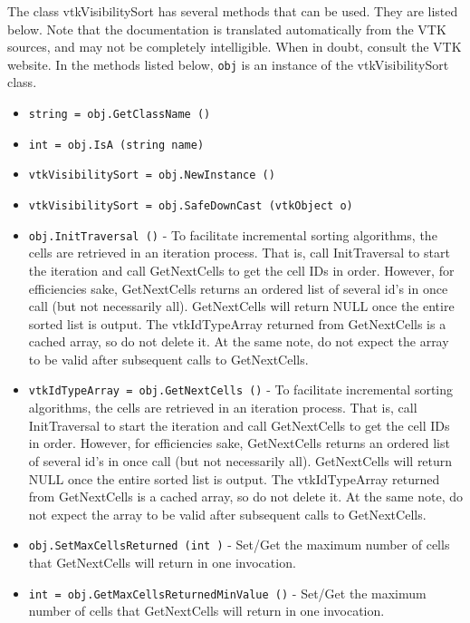 The class vtkVisibilitySort has several methods that can be used.
  They are listed below.
Note that the documentation is translated automatically from the VTK sources,
and may not be completely intelligible.  When in doubt, consult the VTK website.
In the methods listed below, \verb|obj| is an instance of the vtkVisibilitySort class.
\begin{itemize}
\item  \verb|string = obj.GetClassName ()|

\item  \verb|int = obj.IsA (string name)|

\item  \verb|vtkVisibilitySort = obj.NewInstance ()|

\item  \verb|vtkVisibilitySort = obj.SafeDownCast (vtkObject o)|

\item  \verb|obj.InitTraversal ()| -  To facilitate incremental sorting algorithms, the cells are retrieved
 in an iteration process.  That is, call InitTraversal to start the
 iteration and call GetNextCells to get the cell IDs in order.
 However, for efficiencies sake, GetNextCells returns an ordered list
 of several id's in once call (but not necessarily all).  GetNextCells
 will return NULL once the entire sorted list is output.  The
 vtkIdTypeArray returned from GetNextCells is a cached array, so do not
 delete it.  At the same note, do not expect the array to be valid
 after subsequent calls to GetNextCells.

\item  \verb|vtkIdTypeArray = obj.GetNextCells ()| -  To facilitate incremental sorting algorithms, the cells are retrieved
 in an iteration process.  That is, call InitTraversal to start the
 iteration and call GetNextCells to get the cell IDs in order.
 However, for efficiencies sake, GetNextCells returns an ordered list
 of several id's in once call (but not necessarily all).  GetNextCells
 will return NULL once the entire sorted list is output.  The
 vtkIdTypeArray returned from GetNextCells is a cached array, so do not
 delete it.  At the same note, do not expect the array to be valid
 after subsequent calls to GetNextCells.

\item  \verb|obj.SetMaxCellsReturned (int )| -  Set/Get the maximum number of cells that GetNextCells will return
 in one invocation.

\item  \verb|int = obj.GetMaxCellsReturnedMinValue ()| -  Set/Get the maximum number of cells that GetNextCells will return
 in one invocation.


\end{itemize}

